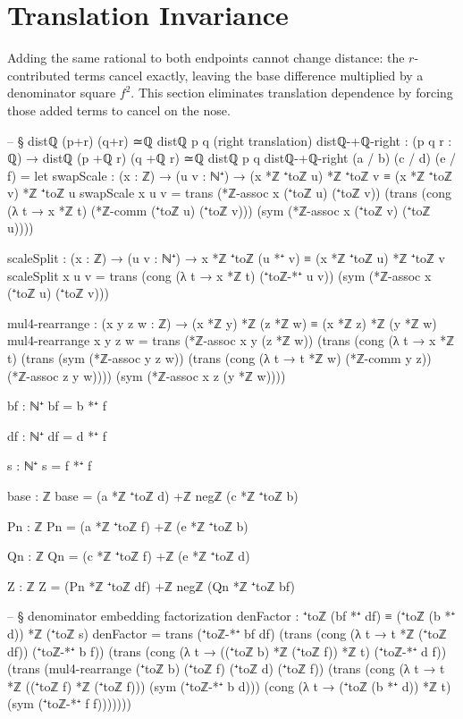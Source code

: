 \documentclass[11pt,a4paper]{book}
\begin{document}
\section{Translation Invariance}

Adding the same rational to both endpoints cannot change distance: the
$r$-contributed terms cancel exactly, leaving the base difference
multiplied by a denominator square $f^2$.  This section eliminates translation
dependence by forcing those added terms to cancel on the nose.

\begin{code}
-- § distℚ (p+r) (q+r) ≃ℚ distℚ p q (right translation)
distℚ-+ℚ-right : (p q r : ℚ) → distℚ (p +ℚ r) (q +ℚ r) ≃ℚ distℚ p q
distℚ-+ℚ-right (a / b) (c / d) (e / f) =
  let
    swapScale : (x : ℤ) → (u v : ℕ⁺) → (x *ℤ ⁺toℤ u) *ℤ ⁺toℤ v ≡ (x *ℤ ⁺toℤ v) *ℤ ⁺toℤ u
    swapScale x u v =
      trans
        (*ℤ-assoc x (⁺toℤ u) (⁺toℤ v))
        (trans
          (cong (λ t → x *ℤ t) (*ℤ-comm (⁺toℤ u) (⁺toℤ v)))
          (sym (*ℤ-assoc x (⁺toℤ v) (⁺toℤ u))))

    scaleSplit : (x : ℤ) → (u v : ℕ⁺) → x *ℤ ⁺toℤ (u *⁺ v) ≡ (x *ℤ ⁺toℤ u) *ℤ ⁺toℤ v
    scaleSplit x u v =
      trans
        (cong (λ t → x *ℤ t) (⁺toℤ-*⁺ u v))
        (sym (*ℤ-assoc x (⁺toℤ u) (⁺toℤ v)))

    mul4-rearrange : (x y z w : ℤ) → (x *ℤ y) *ℤ (z *ℤ w) ≡ (x *ℤ z) *ℤ (y *ℤ w)
    mul4-rearrange x y z w =
      trans
        (*ℤ-assoc x y (z *ℤ w))
        (trans
          (cong (λ t → x *ℤ t)
            (trans
              (sym (*ℤ-assoc y z w))
              (trans
                (cong (λ t → t *ℤ w) (*ℤ-comm y z))
                (*ℤ-assoc z y w))))
          (sym (*ℤ-assoc x z (y *ℤ w))))

    bf : ℕ⁺
    bf = b *⁺ f

    df : ℕ⁺
    df = d *⁺ f

    s : ℕ⁺
    s = f *⁺ f

    base : ℤ
    base = (a *ℤ ⁺toℤ d) +ℤ negℤ (c *ℤ ⁺toℤ b)

    Pn : ℤ
    Pn = (a *ℤ ⁺toℤ f) +ℤ (e *ℤ ⁺toℤ b)

    Qn : ℤ
    Qn = (c *ℤ ⁺toℤ f) +ℤ (e *ℤ ⁺toℤ d)

    Z : ℤ
    Z = (Pn *ℤ ⁺toℤ df) +ℤ negℤ (Qn *ℤ ⁺toℤ bf)

    -- § denominator embedding factorization
    denFactor : ⁺toℤ (bf *⁺ df) ≡ (⁺toℤ (b *⁺ d)) *ℤ (⁺toℤ s)
    denFactor =
      trans
        (⁺toℤ-*⁺ bf df)
        (trans
          (cong (λ t → t *ℤ (⁺toℤ df)) (⁺toℤ-*⁺ b f))
          (trans
            (cong (λ t → ((⁺toℤ b) *ℤ (⁺toℤ f)) *ℤ t) (⁺toℤ-*⁺ d f))
            (trans
              (mul4-rearrange (⁺toℤ b) (⁺toℤ f) (⁺toℤ d) (⁺toℤ f))
              (trans
                (cong (λ t → t *ℤ ((⁺toℤ f) *ℤ (⁺toℤ f))) (sym (⁺toℤ-*⁺ b d)))
                (cong (λ t → (⁺toℤ (b *⁺ d)) *ℤ t) (sym (⁺toℤ-*⁺ f f)))))))


\end{code}
\end{document}
